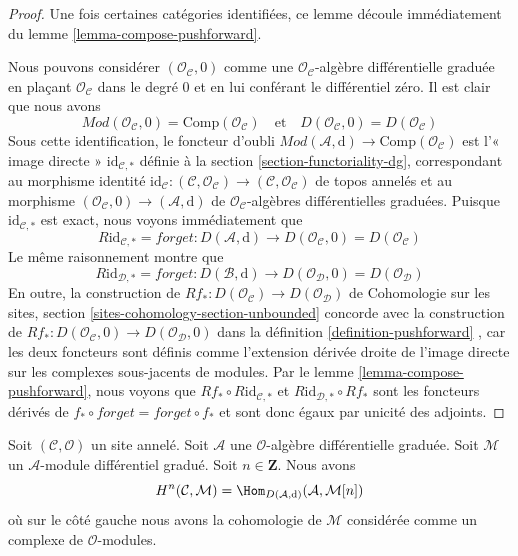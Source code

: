 \begin{proof}
Une fois certaines catégories identifiées, ce lemme découle immédiatement du lemme \ref{lemma-compose-pushforward}.

\medskip\noindent
Nous pouvons considérer $(\mathcal{O}_\mathcal{C}, 0)$ comme une $\mathcal{O}_\mathcal{C}$-algèbre différentielle graduée en plaçant $\mathcal{O}_\mathcal{C}$ dans le degré $0$ et en lui conférant le différentiel zéro.
Il est clair que nous avons
$$
\textit{Mod}(\mathcal{O}_\mathcal{C}, 0) =
\text{Comp}(\mathcal{O}_\mathcal{C})
\quad\text{et}\quad
D(\mathcal{O}_\mathcal{C}, 0) = D(\mathcal{O}_\mathcal{C})
$$
Sous cette identification, le foncteur d'oubli $\textit{Mod}(\mathcal{A}, \text{d}) \to \text{Comp}(\mathcal{O}_\mathcal{C})$ est l'« image directe » $\text{id}_{\mathcal{C}, *}$ définie à la section \ref{section-functoriality-dg}, correspondant au morphisme identité $\text{id}_\mathcal{C} : (\mathcal{C}, \mathcal{O}_\mathcal{C}) \to (\mathcal{C}, \mathcal{O}_\mathcal{C})$ de topos annelés et au morphisme $(\mathcal{O}_\mathcal{C}, 0) \to (\mathcal{A}, \text{d})$ de $\mathcal{O}_\mathcal{C}$-algèbres différentielles graduées.
Puisque $\text{id}_{\mathcal{C}, *}$ est exact, nous voyons immédiatement que
$$
R\text{id}_{\mathcal{C}, *} = forget :
D(\mathcal{A}, \text{d}) \longrightarrow
D(\mathcal{O}_\mathcal{C}, 0) = D(\mathcal{O}_\mathcal{C})
$$
Le même raisonnement montre que
$$
R\text{id}_{\mathcal{D}, *} = forget :
D(\mathcal{B}, \text{d}) \longrightarrow
D(\mathcal{O}_\mathcal{D}, 0) = D(\mathcal{O}_\mathcal{D})
$$
En outre, la construction de $Rf_* : D(\mathcal{O}_\mathcal{C}) \to D(\mathcal{O}_\mathcal{D})$ de Cohomologie sur les sites, section \ref{sites-cohomology-section-unbounded}  concorde avec la construction de $Rf_* : D(\mathcal{O}_\mathcal{C}, 0) \to D(\mathcal{O}_\mathcal{D}, 0)$ dans la définition \ref{definition-pushforward} , car les deux foncteurs sont définis comme l'extension dérivée droite de l'image directe sur les complexes sous-jacents de modules.
Par le lemme \ref{lemma-compose-pushforward}, nous voyons que $Rf_* \circ R\text{id}_{\mathcal{C}, *}$ et $R\text{id}_{\mathcal{D}, *} \circ Rf_*$ sont les foncteurs dérivés de $f_* \circ forget = forget \circ f_*$ et sont donc égaux par unicité des adjoints.
\end{proof}

\begin{lemma}
\label{lemma-cohomology-ext}
Soit $(\mathcal{C}, \mathcal{O})$ un site annelé.
Soit $\mathcal{A}$ une $\mathcal{O}$-algèbre différentielle graduée.
Soit $\mathcal{M}$ un $\mathcal{A}$-module différentiel gradué.
Soit $n \in \mathbf{Z}$.
Nous avons
$$
H^n(\mathcal{C}, \mathcal{M}) =
\Hom_{D(\mathcal{A}, \text{d})}(\mathcal{A}, \mathcal{M}[n])
$$
où sur le côté gauche nous avons la cohomologie de $\mathcal{M}$ considérée comme un complexe de $\mathcal{O}$-modules.
\end{lemma}

